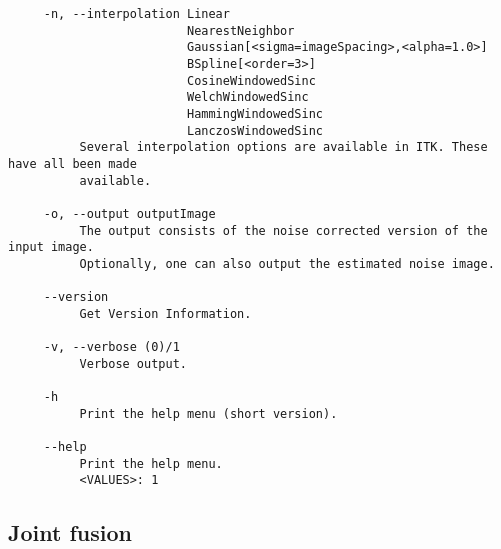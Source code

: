 \documentclass{InsightArticle}
\begin{document}
\begin{verbatim}
     -n, --interpolation Linear
                         NearestNeighbor
                         Gaussian[<sigma=imageSpacing>,<alpha=1.0>]
                         BSpline[<order=3>]
                         CosineWindowedSinc
                         WelchWindowedSinc
                         HammingWindowedSinc
                         LanczosWindowedSinc
          Several interpolation options are available in ITK. These have all been made
          available.

     -o, --output outputImage
          The output consists of the noise corrected version of the input image.
          Optionally, one can also output the estimated noise image.

     --version
          Get Version Information.

     -v, --verbose (0)/1
          Verbose output.

     -h
          Print the help menu (short version).

     --help
          Print the help menu.
          <VALUES>: 1
\end{verbatim}
\normalsize

\subsection{Joint fusion}
\end{document}

